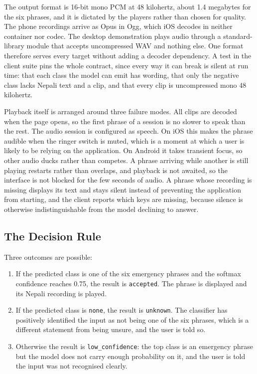 The output format is 16-bit mono PCM at 48 kilohertz, about 1.4 megabytes for the six phrases, and it is dictated by the players rather than chosen for quality. The phone recordings arrive as Opus in Ogg, which iOS decodes in neither container nor codec. The desktop demonstration plays audio through a standard-library module that accepts uncompressed WAV and nothing else. One format therefore serves every target without adding a decoder dependency. A test in the client suite pins the whole contract, since every way it can break is silent at run time: that each class the model can emit has wording, that only the negative class lacks Nepali text and a clip, and that every clip is uncompressed mono 48 kilohertz.

Playback itself is arranged around three failure modes. All clips are decoded when the page opens, so the first phrase of a session is no slower to speak than the rest. The audio session is configured as speech. On iOS this makes the phrase audible when the ringer switch is muted, which is a moment at which a user is likely to be relying on the application. On Android it takes transient focus, so other audio ducks rather than competes. A phrase arriving while another is still playing restarts rather than overlaps, and playback is not awaited, so the interface is not blocked for the few seconds of audio. A phrase whose recording is missing displays its text and stays silent instead of preventing the application from starting, and the client reports which keys are missing, because silence is otherwise indistinguishable from the model declining to answer.

\subsection{The Decision Rule}
\label{sec:decisionrule}

Three outcomes are possible:

\begin{enumerate}
    \item If the predicted class is one of the six emergency phrases and the softmax confidence reaches 0.75, the result is \texttt{accepted}. The phrase is displayed and its Nepali recording is played.
    \item If the predicted class is \texttt{none}, the result is \texttt{unknown}. The classifier has positively identified the input as not being one of the six phrases, which is a different statement from being unsure, and the user is told so.
    \item Otherwise the result is \texttt{low\_confidence}: the top class is an emergency phrase but the model does not carry enough probability on it, and the user is told the input was not recognised clearly.
\end{enumerate}

